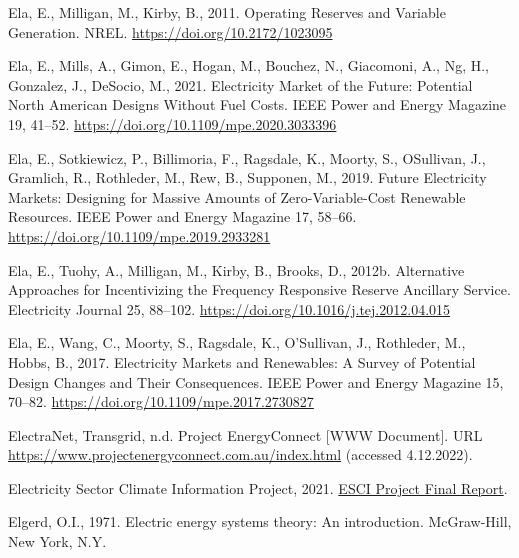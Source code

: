 \documentclass[12pt,a4paper,]{report}
\newlength{\cslhangindent}
\newenvironment{CSLReferences}[2] %
 {%
  \setlength{\parindent}{0pt}
  \ifodd #1 \everypar{\setlength{\hangindent}{\cslhangindent}}\ignorespaces\fi
  \ifnum #2 > 0
  \setlength{\parskip}{#2\baselineskip}
  \fi
 }%
 {}
\begin{document}
\begin{CSLReferences}{1}{0}
\leavevmode{}%
Ela, E., Milligan, M., Kirby, B., 2011. Operating {Reserves} and
{Variable Generation}. {NREL}. \url{https://doi.org/10.2172/1023095}

\leavevmode{}%
Ela, E., Mills, A., Gimon, E., Hogan, M., Bouchez, N., Giacomoni, A.,
Ng, H., Gonzalez, J., DeSocio, M., 2021. Electricity {Market} of the
{Future}: {Potential North American Designs Without Fuel Costs}. IEEE
Power and Energy Magazine 19, 41--52.
\url{https://doi.org/10.1109/mpe.2020.3033396}

\leavevmode{}%
Ela, E., Sotkiewicz, P., Billimoria, F., Ragsdale, K., Moorty, S.,
OSullivan, J., Gramlich, R., Rothleder, M., Rew, B., Supponen, M., 2019.
Future {Electricity Markets}: {Designing} for {Massive Amounts} of
{Zero-Variable-Cost Renewable Resources}. IEEE Power and Energy Magazine
17, 58--66. \url{https://doi.org/10.1109/mpe.2019.2933281}

\leavevmode{}%
Ela, E., Tuohy, A., Milligan, M., Kirby, B., Brooks, D., 2012b.
Alternative {Approaches} for {Incentivizing} the {Frequency Responsive
Reserve Ancillary Service}. Electricity Journal 25, 88--102.
\url{https://doi.org/10.1016/j.tej.2012.04.015}

\leavevmode{}%
Ela, E., Wang, C., Moorty, S., Ragsdale, K., O'Sullivan, J., Rothleder,
M., Hobbs, B., 2017. Electricity {Markets} and {Renewables}: {A Survey}
of {Potential Design Changes} and {Their Consequences}. IEEE Power and
Energy Magazine 15, 70--82.
\url{https://doi.org/10.1109/mpe.2017.2730827}

\leavevmode{}%
ElectraNet, Transgrid, n.d. Project {EnergyConnect} {[}WWW Document{]}.
URL \url{https://www.projectenergyconnect.com.au/index.html} (accessed
4.12.2022).

\leavevmode{}%
Electricity Sector Climate Information Project, 2021.
\href{https://www.climatechangeinaustralia.gov.au/media/ccia/2.2/cms_page_media/799/ESCI\%20Project\%20final\%20report_210721.pdf}{{ESCI
Project Final Report}}.

\leavevmode{}%
Elgerd, O.I., 1971. Electric energy systems theory: An introduction.
{McGraw-Hill}, {New York, N.Y}.


\end{CSLReferences}
\end{document}
